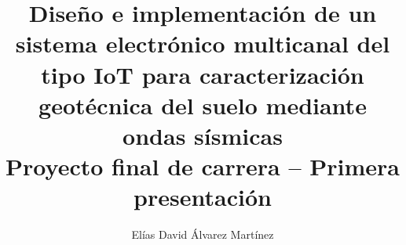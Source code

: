 \documentclass[10pt,a4paper,twocolumn]{article}
\title{Diseño e implementación de un sistema electrónico multicanal del tipo IoT para
caracterización geotécnica del suelo mediante ondas sísmicas\\[0.5em]
\large Proyecto final de carrera -- Primera presentación}
\author{Elías David Álvarez Martínez}
\date{}
\begin{document}
\maketitle







\FloatBarrier

{\footnotesize
}
\end{document}
